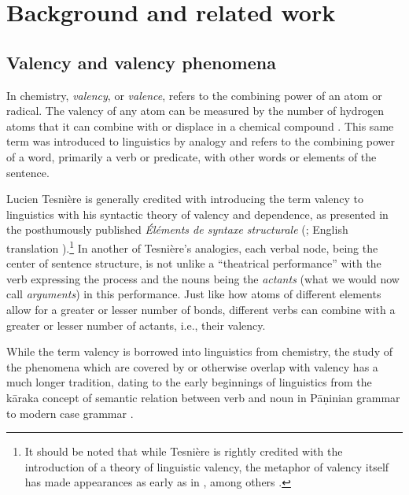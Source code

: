 \section{Background and related work}\label{sec:background}

\subsection{Valency and valency phenomena}\label{subsec:valency}


In chemistry, \textit{valency}, or \textit{valence}, refers to the combining power of an atom or radical. The valency of any atom can be measured by the number of hydrogen atoms that it can combine with or displace in a chemical compound \citep{law2020a}. This same term was introduced to linguistics by analogy and refers to the combining power of a word, primarily a verb or predicate, with other words or elements of the sentence. 

Lucien Tesnière is generally credited with introducing the term valency to linguistics with his syntactic theory of valency and dependence, as presented in the posthumously published \textit{Éléments de syntaxe structurale} (\cite*{tesniere1959}; English translation \cite*{tesniere2015}).\footnote{
    It should be noted that while Tesnière is rightly credited with the introduction of a theory of linguistic valency, the metaphor of valency itself has made appearances as early as in \citet{peirce1897}, among others \citep{przepiorkowski2018}.
}
In another of Tesnière's analogies, each verbal node, being the center of sentence structure, is not unlike a ``theatrical performance'' with the verb expressing the process and the nouns being the \textit{actants} (what we would now call \textit{arguments}) in this performance. Just like how atoms of different elements allow for a greater or lesser number of bonds, different verbs can combine with a greater or lesser number of actants, i.e., their valency.

While the term valency is borrowed into linguistics from chemistry, the study of the phenomena which are covered by or otherwise overlap with valency has a much longer tradition, dating to the early beginnings of linguistics from the kāraka concept of semantic relation between verb and noun \citep{ganeri2011a} in Pāṇinian grammar to modern case grammar \citep{fillmore1968}. 

